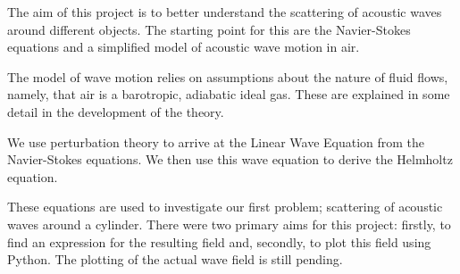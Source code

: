 The aim of this project is to better understand the scattering of acoustic waves around different objects. The starting point for this are the Navier-Stokes equations and a simplified model of acoustic wave motion in air.

The model of wave motion relies on assumptions about the nature of fluid flows, namely, that air is a barotropic, adiabatic ideal gas. These are explained in some detail in the development of the theory.

We use perturbation theory to arrive at the Linear Wave Equation from the Navier-Stokes equations. We then use this wave equation to derive the Helmholtz equation.

These equations are used to investigate our first problem; scattering of acoustic waves around a cylinder. There were two primary aims for this project: firstly, to find an expression for the resulting field and, secondly, to plot this field using Python. The plotting of the actual wave field is still pending.